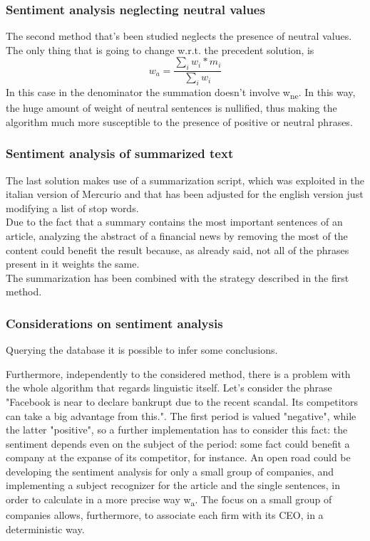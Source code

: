 \subsubsection{Sentiment analysis neglecting neutral values}

The second method that's been studied neglects the presence of neutral values. The only thing that is going to change w.r.t. the precedent solution, is 
\begin{equation}
w_a = \frac{\sum\limits_{i} w_i * m_i}{\sum\limits_{i} w_i} 
\end{equation}
In this case in the denominator the summation doesn't involve w\textsubscript{ne}. In this way, the huge amount of weight of neutral sentences is nullified, thus making the algorithm much more susceptible to the presence of positive or neutral phrases.\\

\subsubsection{Sentiment analysis of summarized text}
The last solution makes use of a summarization script, which was exploited in the italian version of Mercurio and that has been adjusted for the english version just modifying a list of stop words. \\
Due to the fact that a summary contains the most important sentences of an article, analyzing the abstract of a financial news by removing the most of the content could benefit the result because, as already said, not all of the phrases present in it weights the same. \\
The summarization has been combined with the strategy described in the first method. 

\subsubsection{Considerations on sentiment analysis}
Querying the database it is possible to infer some conclusions.

Furthermore, independently to the considered method, there is a problem with the whole algorithm that regards linguistic itself. Let's consider the phrase "Facebook is near to declare bankrupt due to the recent scandal. Its competitors can take a big advantage from this.". The first period is valued "negative", while the latter "positive", so a further implementation has to consider this fact: the sentiment depends even on the subject of the period: some fact could benefit a company at the expanse of its competitor, for instance. An open road could be developing the sentiment analysis for only a small group of companies, and implementing a subject recognizer for the article and the single sentences, in order to calculate in a more precise way w\textsubscript{a}. The focus on a small group of companies allows, furthermore, to associate each firm with its CEO, in a deterministic way.  